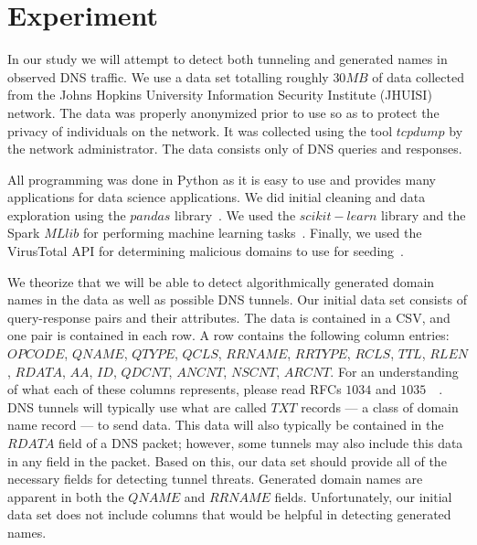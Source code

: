\section{Experiment}

In our study we will attempt to detect both tunneling and generated names in observed DNS traffic.
We use a data set totalling roughly $30 MB$ of data collected from the Johns Hopkins
University Information Security Institute (JHUISI) network.
The data was properly anonymized prior to use so as to protect the privacy of individuals on the network.
It was collected using the tool $tcpdump$ by the network administrator.
The data consists only of DNS queries and responses.

All programming was done in Python as it is easy to use and provides many applications for data
science applications.
We did initial cleaning and data exploration using the $pandas$ library~\cite{pandas}.
We used the $scikit-learn$ library and the Spark $MLlib$ for performing machine learning tasks~\cite{scikit}.
Finally, we used the VirusTotal API for determining malicious domains to use for seeding~\cite{vt}.

We theorize that we will be able to detect algorithmically generated domain names in the data as
well as possible DNS tunnels.
Our initial data set consists of query-response pairs and their attributes.
The data is contained in a CSV, and one pair is contained in each row.
A row contains the following column entries: $OPCODE$, $QNAME$, $QTYPE$, $QCLS$, $RRNAME$, $RRTYPE$,
$RCLS$, $TTL$, $RLEN$, $RDATA$, $AA$, $ID$, $QDCNT$, $ANCNT$, $NSCNT$, $ARCNT$.
For an understanding of what each of these columns represents, please read RFCs $1034$ and $1035$~\cite{rfc1034}~\cite{rfc1035}.
DNS tunnels will typically use what are called $TXT$ records --- a class of domain name record ---
to send data.
This data will also typically be contained in the $RDATA$ field of a DNS packet; however, some
tunnels may also include this data in any field in the packet.
Based on this, our data set should provide all of the necessary fields for detecting tunnel threats.
Generated domain names are apparent in both the $QNAME$ and $RRNAME$ fields.
Unfortunately, our initial data set does not include columns that would be helpful in detecting
generated names.


